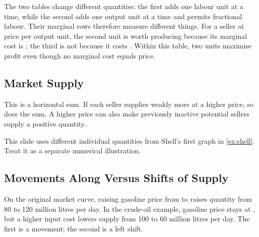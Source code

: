 The two tables change different quantities: the first adds one labour
unit at a time, while the second adds one output unit at a time and permits
fractional labour. Their marginal rows therefore measure different things.
For a seller at price  per output unit, the second unit is
worth producing because its marginal cost is ; the third
is not because it costs . Within this table, two units
maximise profit even though no marginal cost equals price.

\subsection{Market Supply}
This is a horizontal sum. If each seller supplies weakly more at a higher
price, so does the sum. A higher price can also make previously inactive
potential sellers supply a positive quantity.

This slide uses different individual quantities from Shell's first graph
in \cref{ex:shell}. Treat it as a separate numerical illustration.

\subsection{Movements Along Versus Shifts of Supply}
On the original market curve, raising gasoline price from 
to  raises quantity from 80 to 120 million litres per day.
In the crude-oil example, gasoline price stays at , but a
higher input cost lowers supply from 100 to 60 million litres per day.
The first is a movement; the second is a left shift.

